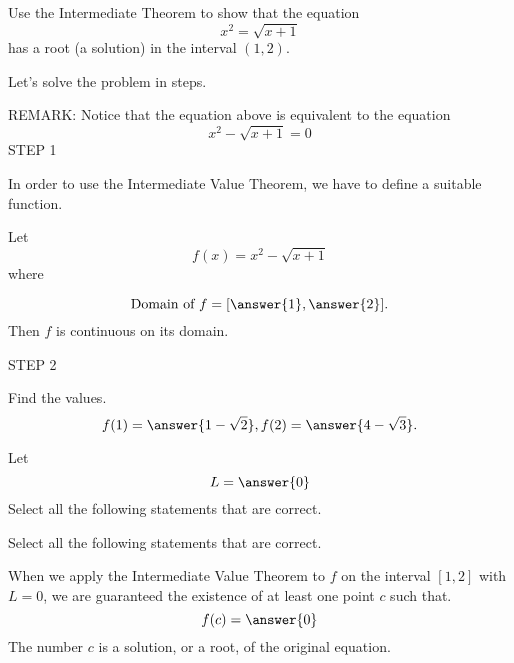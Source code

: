 \documentclass{ximera}
\author{Nela Lakos }
\begin{document}
\begin{exercise}

Use the Intermediate Theorem to show that the equation
\[
x^2=\sqrt{x+1}
\]
has a root  (a solution) in the interval $(1,2)$.

Let's solve the problem in steps.

REMARK:
Notice that  the equation above is equivalent to the equation 
\[
x^2-\sqrt{x+1}=0
\]
STEP 1

 In order to use the Intermediate Value Theorem, we have to define a  suitable function.

Let
\[
f(x)=x^2-\sqrt{x+1}
\]
where

\[
\text{Domain of }  f=[\answer{1},\answer{2}].
\]
Then $f$ is continuous on its domain.


STEP 2

\begin{exercise}

Find the values.
\[
f(1)=\answer{1-\sqrt{2}},
f(2)=\answer{4-\sqrt{3}}.
\]

\end{exercise}
\begin{exercise}
Let
\[
L=\answer{0}
\]
Select all the following statements that are correct.

\begin{selectAll}
\end{selectAll}
\end{exercise}
\begin{exercise}
Select all the following statements that are correct.

\begin{selectAll}
\end{selectAll}

\end{exercise}
When we apply the Intermediate Value Theorem to $f$ on the interval $\left[1,2\right]$ with $L=0$, we are guaranteed the existence of at least one point $c$ such that.
\[
f(c)=\answer{0}
\]
The number $c$ is a solution, or a root, of the original equation.
\end{exercise}
\end{document}
